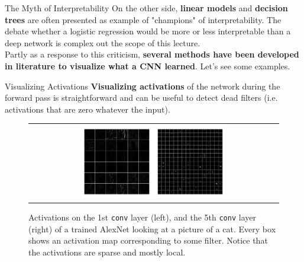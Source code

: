 \documentclass[aspectratio=169]{beamer}
\begin{document}

\begin{frame}{The Myth of Interpretability}
On the other side, \textbf{linear models} and \textbf{decision trees} are often presented as example of "champions" of interpretability. The debate whether a logistic regression would be more or less interpretable than a deep network is complex out the scope of this lecture.\\
\vspace{0.5cm}
Partly as a response to this criticism, \textbf{several methods have been developed in literature to visualize what a CNN learned}. Let's see some examples.
\end{frame}


\begin{frame}{Visualizing Activations}
\textbf{Visualizing activations} of the network during the forward pass is straightforward and can be useful to detect dead filters (i.e. activations that are zero whatever the input).%
\begin{figure}
\begin{tabular}{c}
\includegraphics[width=0.6\textwidth]{img/cnn/visualize_activation.png} 
\end{tabular}
\caption{Activations on the 1st \texttt{conv} layer (left), and the 5th \texttt{conv} layer (right) of a trained AlexNet looking at a picture of a cat. Every box shows an activation map corresponding to some filter. Notice that the activations are sparse and mostly local.}
\end{figure}
\end{frame}

\end{document}
